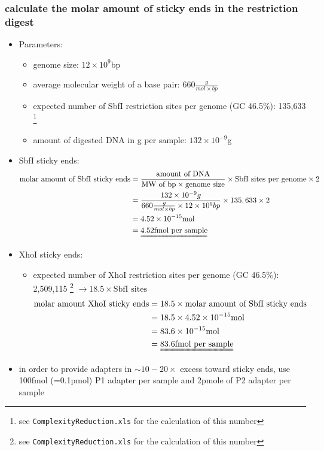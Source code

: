 \subsubsection
{calculate the molar amount of sticky ends in the restriction digest}
\begin{itemize}
\item Parameters:
	\begin{itemize}
	\item genome size: $12\times10^{9}$bp
	\item average molecular weight of a base pair: 660$\frac{g}{mol\times bp}$
	\item expected number of SbfI restriction sites per genome (GC 46.5\%): 135,633 \footnote{see \texttt{ComplexityReduction.xls} for the calculation of this number }
	\item amount of digested DNA in g per sample: $132\times 10^{-9}$g
	\end{itemize}

\item SbfI sticky ends:
\begin{align}
\text{molar amount of SbfI sticky ends} &= \frac{\text{amount of DNA}}{\text{MW of bp} \times \text{genome size} } \times \text{SbfI sites per genome} \times 2 \\ \nonumber 
							   &= \frac{132\times 10^{-9}g}{660 \frac{g}{mol\times bp} \times 12\times10^{9} bp} \times 135,633 \times 2\\ \nonumber
							   &= 4.52 \times 10^{-15} \text{mol}\\ \nonumber
							   &= \uuline{4.52 \text{fmol per sample}}
\end{align}

\item XhoI sticky ends:
	\begin{itemize}
	\item expected number of XhoI restriction sites per genome (GC 46.5\%): \\ 2,509,115 \footnote{see \texttt{ComplexityReduction.xls} for the calculation of this number } $\rightarrow 18.5 \times \text{SbfI sites}$ 
	\begin{align}
	\text{molar amount XhoI sticky ends} &= 18.5 \times \text{molar amount of SbfI sticky ends} \\ \nonumber
								&= 18.5 \times 4.52 \times 10^{-15} \text{mol} \\ \nonumber
								&= 83.6 \times 10^{-15} \text{mol} \\ \nonumber
								&= \uuline{83.6\text{fmol per sample}}
	\end{align}
	\end{itemize}
\item in order to provide adapters in $\sim10-20 \times$ excess toward sticky ends, use 100fmol (=0.1pmol) P1 adapter per sample and 2pmole of P2 adapter per sample
\end{itemize}

